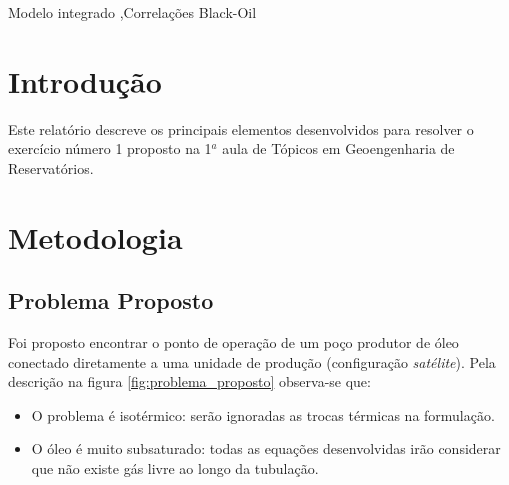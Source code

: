 \documentclass[final,3p]{elsarticle}
\numberwithin{equation}{section}
\begin{document}
\begin{frontmatter}


\begin{keyword}
    Modelo integrado \sep Correlações Black-Oil



\end{keyword}

\end{frontmatter}


\section{Introdução}

    Este relatório descreve os principais elementos desenvolvidos para resolver o exercício número 1 proposto na 1$^a$ aula de Tópicos em Geoengenharia de Reservatórios.

\section{Metodologia}

    \subsection{Problema Proposto}

        Foi proposto encontrar o ponto de operação de um poço produtor de óleo conectado diretamente a uma unidade de produção (configuração \emph{satélite}). Pela descrição na figura \ref{fig:problema_proposto} observa-se que:

        \begin{itemize}
            \item O problema é isotérmico: serão ignoradas as trocas térmicas na formulação.
            \item O óleo é muito subsaturado: todas as equações desenvolvidas irão considerar que não existe gás livre ao longo da tubulação.
        \end{itemize}
\end{document}

